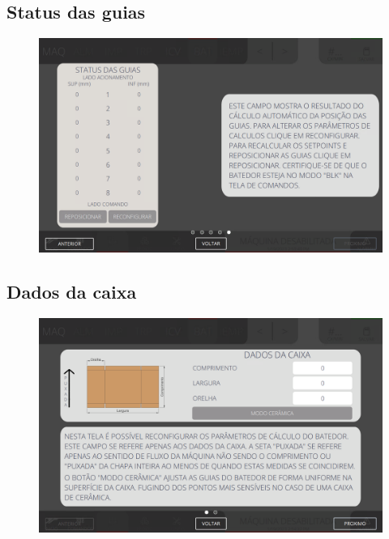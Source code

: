\newpage
\thispagestyle{fancy}
\vspace{\fill}
\subsection{\small Status das guias}
\begin{figure}
    \centering
    \includegraphics[width=576 px,height=360 px]{src/imagesICV/07-scout/settings/e-5.png}
\end{figure}

\newpage
\thispagestyle{fancy}
\vspace{\fill}
\subsection{\small Dados da caixa}
\begin{figure}
    \centering
    \includegraphics[width=576 px,height=360 px]{src/imagesICV/07-scout/settings/e-6.png}
\end{figure}

